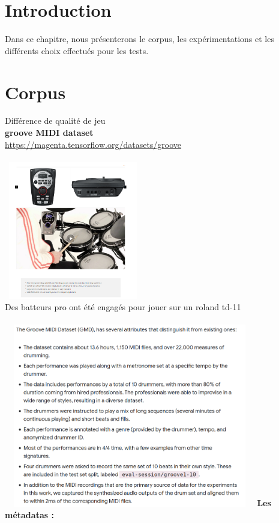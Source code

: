 \section*{Introduction}
Dans ce chapitre, nous présenterons le corpus, les expérimentations et les différents choix effectués pour les tests.
\section{Corpus}
Différence de qualité de jeu\\
\textbf{groove MIDI dataset}\\
\url{https://magenta.tensorflow.org/datasets/groove}\\\\
\includegraphics[height=60mm, width=60mm]{z_images/3_groove/roland_TD11.png}\\
Des batteurs pro ont été engagés pour jouer sur un roland td-11\\\\
\includegraphics[height=80mm, width=110mm]{z_images/3_groove/dataset_how.png}\newpage{}
\textbf{Les métadatas :}\\\\
